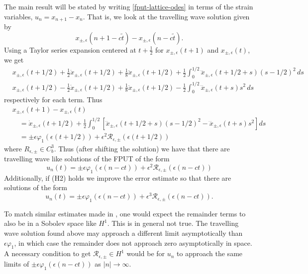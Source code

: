 The main result will be stated by writing \cref{fput-lattice-odes} in terms of the strain variables, \(u_n = x_{n+1} - x_n\). That is, we look at the travelling wave solution given by 
\begin{equation}
	x_{\pm, \epsilon}(n+1-c\tilde t) - x_{\pm, \epsilon}(n-c\tilde t).
\end{equation}
Using a Taylor series expansion centered at \(t + \frac 12 \) for \( x_{\pm, \epsilon}(t+ 1)\) and \( x_{\pm, \epsilon}(t)\), we get 
\begin{align}
	& x_{\pm, \epsilon}(t+ 1/2) + \frac 12 \dot x_{\pm, \epsilon}(t+1/2) + \frac 1 8\ddot x_{\pm, \epsilon}(t+1/2) + \frac 1 2\int_{0}^{1/2} \dddot x_{\pm, \epsilon}(t+1/2+s)(s-1/2)^2 \, ds \\
	& x_{\pm, \epsilon}(t+ 1/2) - \frac 12 \dot x_{\pm, \epsilon}(t+1/2) + \frac 1 8 \ddot x_{\pm, \epsilon}(t+1/2) - \frac 1 2\int_0^{1/2} \dddot x_{\pm, \epsilon}(t+s)s^2 \, ds 
\end{align}
respectively for each term. Thus 
\begin{equation}
\begin{aligned}
	&x_{\pm, \epsilon}(t+1) - x_{\pm, \epsilon}(t) \\
	&\quad= \dot x_{\pm, \epsilon}(t+ 1/2) + \frac 12 \int_{0}^{1/2} [\dddot x_{\pm, \epsilon}(t+1/2+s)(s-1/2)^2 - \dddot x_{\pm, \epsilon}(t+s)s^2] ds \\
	&\quad= \pm \epsilon \varphi_1(\epsilon (t+1/2)) + \epsilon^2 \mathcal R_{\epsilon, \pm}(\epsilon (t+1/2))
\end{aligned}
\end{equation}
where \(R_{\epsilon, \pm} \in C^3_b\). Thus (after shifting the solution) we have that there are travelling wave like solutions of the FPUT of the form
\begin{equation}
	u_n(t) = \pm \epsilon \varphi_1(\epsilon(n-ct)) + \epsilon^2 \mathcal R_{\epsilon, \pm}(\epsilon (n-ct))
\end{equation}
Additionally, if (H2) holds we improve the error estimate so that there are solutions of the form 
\begin{equation}
	u_n(t) = \pm \epsilon \varphi_1(\epsilon(n-ct)) + \epsilon^3 \mathcal R_{\epsilon, \pm}(\epsilon (n-ct)).
\end{equation}

To match similar estimates made in \cite{friesecke1999solitary}, one would expect the remainder terms to also be in a Sobolev space like \(H^1\). This is in general not true. The travelling wave solution found above may approach a different limit asymptotically than \(\epsilon \varphi_1 \), in which case the remainder does not approach zero asymptotically in space. A necessary condition to get \(\mathcal R_{\epsilon,\pm}\in H^1\) would be for \(u_n\) to approach the same limits of \(\pm \epsilon \varphi_1(\epsilon (n-ct))\) as \(|n| \to \infty\).

